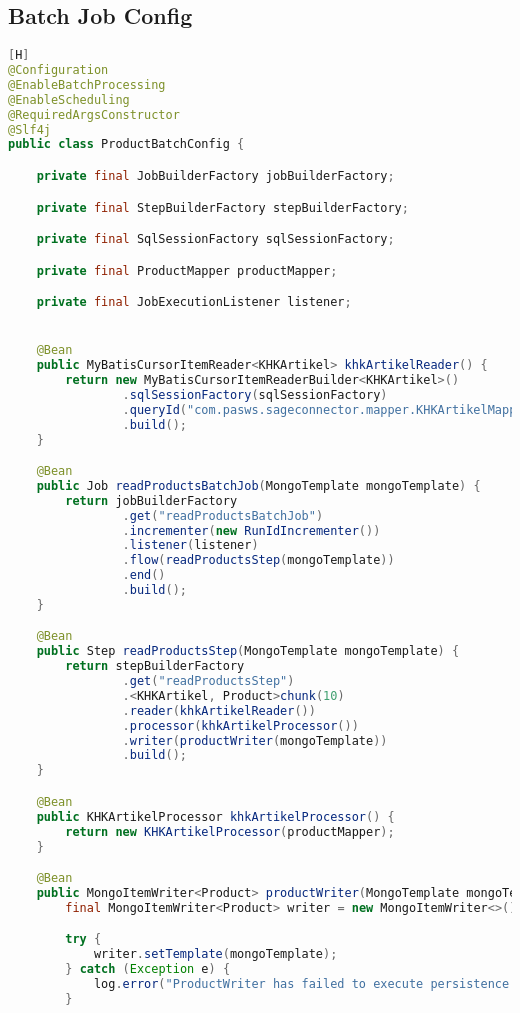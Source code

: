 \subsection{Batch Job Config}
\begin{lstlisting}[language=JAVA,caption=ProductBatchConfig.java][H]
@Configuration
@EnableBatchProcessing
@EnableScheduling
@RequiredArgsConstructor
@Slf4j
public class ProductBatchConfig {

    private final JobBuilderFactory jobBuilderFactory;

    private final StepBuilderFactory stepBuilderFactory;

    private final SqlSessionFactory sqlSessionFactory;

    private final ProductMapper productMapper;

    private final JobExecutionListener listener;


    @Bean
    public MyBatisCursorItemReader<KHKArtikel> khkArtikelReader() {
        return new MyBatisCursorItemReaderBuilder<KHKArtikel>()
                .sqlSessionFactory(sqlSessionFactory)
                .queryId("com.pasws.sageconnector.mapper.KHKArtikelMapper.findAllKHKArtikel")
                .build();
    }

    @Bean
    public Job readProductsBatchJob(MongoTemplate mongoTemplate) {
        return jobBuilderFactory
                .get("readProductsBatchJob")
                .incrementer(new RunIdIncrementer())
                .listener(listener)
                .flow(readProductsStep(mongoTemplate))
                .end()
                .build();
    }

    @Bean
    public Step readProductsStep(MongoTemplate mongoTemplate) {
        return stepBuilderFactory
                .get("readProductsStep")
                .<KHKArtikel, Product>chunk(10)
                .reader(khkArtikelReader())
                .processor(khkArtikelProcessor())
                .writer(productWriter(mongoTemplate))
                .build();
    }

    @Bean
    public KHKArtikelProcessor khkArtikelProcessor() {
        return new KHKArtikelProcessor(productMapper);
    }

    @Bean
    public MongoItemWriter<Product> productWriter(MongoTemplate mongoTemplate) {
        final MongoItemWriter<Product> writer = new MongoItemWriter<>();

        try {
            writer.setTemplate(mongoTemplate);
        } catch (Exception e) {
            log.error("ProductWriter has failed to execute persistence tasks to MongodB!", e);
        }


\end{lstlisting}
